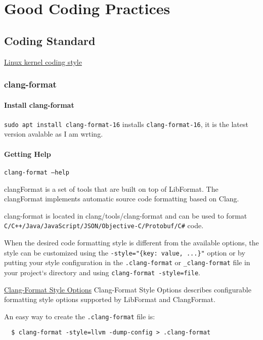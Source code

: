 \chapter{Good Coding Practices}


\section{Coding Standard}

\href{https://www.kernel.org/doc/html/v4.10/process/coding-style.html}{Linux kernel coding style} 
\subsection{clang-format}

\subsubsection{Install clang-format}%
\texttt{sudo apt install clang-format-16} installs \texttt{clang-format-16}, it is the latest version avalable as I am wrting. 

\subsubsection{Getting Help}%
\label{ssub:getting_help}
\texttt{clang-format --help}

clangFormat is a set of tools that are built on top of LibFormat. The clangFormat implements automatic source code formatting based on Clang.

clang-format is located in clang/tools/clang-format and can be used to format \texttt{C/C++/Java/JavaScript/JSON/Objective-C/Protobuf/C\#} code.


When the desired code formatting style is different from the available options, the style can be customized using the \texttt{-style="\{key: value, ...\}"} option or by putting your style configuration in the \texttt{.clang-format} or \texttt{\_clang-format} file in your project`s directory and using \texttt{clang-format -style=file}.


\href{https://clang.llvm.org/docs/ClangFormatStyleOptions.html#}{Clang-Format Style Options} 
Clang-Format Style Options describes configurable formatting style options supported by LibFormat and ClangFormat.

An easy way to create the \texttt{.clang-format} file is:
\begin{verbatim}
  $ clang-format -style=llvm -dump-config > .clang-format
\end{verbatim}

